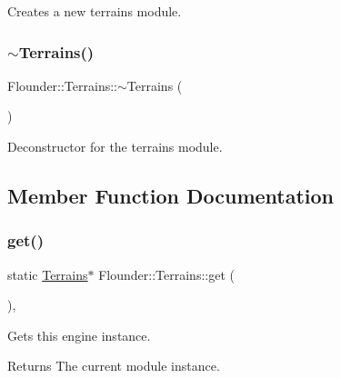 Creates a new terrains module. 

\mbox{\label{class_flounder_1_1_terrains_a17bd0286821c4887893fd711ed3e9ddc}} 
\subsubsection{\texorpdfstring{$\sim$\+Terrains()}{~Terrains()}}
{\footnotesize\ttfamily Flounder\+::\+Terrains\+::$\sim$\+Terrains (\begin{DoxyParamCaption}{ }\end{DoxyParamCaption})}



Deconstructor for the terrains module. 



\subsection{Member Function Documentation}
\mbox{\label{class_flounder_1_1_terrains_a7b9b534b29b363a8592f7d0ea007be87}} 
\subsubsection{\texorpdfstring{get()}{get()}}
{\footnotesize\ttfamily static \hyperlink{class_flounder_1_1_terrains}{Terrains}$\ast$ Flounder\+::\+Terrains\+::get (\begin{DoxyParamCaption}{ }\end{DoxyParamCaption})\hspace{0.3cm}{\ttfamily [inline]}, {\ttfamily [static]}}



Gets this engine instance. 

\begin{DoxyReturn}{Returns}
The current module instance. 
\end{DoxyReturn}
\mbox{\label{class_flounder_1_1_terrains_a6f6cd529efd3a88512da96f6c260689a}} 
